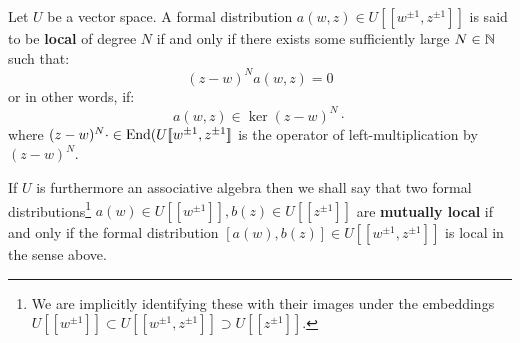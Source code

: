         \begin{definition}[Locality] \label{def: locality}
            Let $U$ be a vector space. A formal distribution $a(w, z) \in U[\![w^{\pm 1}, z^{\pm 1}]\!]$ is said to be \textbf{local} of degree $N$ if and only if there exists some sufficiently large $N \in \mathbb{N}$ such that:
                $$(z - w)^N a(w, z) = 0$$
            or in other words, if:
                $$a(w, z) \in \ker (z - w)^N \cdot$$
            where $(z - w)^N \cdot \in \mathrm{End}( U[\![w^{\pm 1}, z^{\pm 1}]\!]$ is the operator of left-multiplication by $(z - w)^N$.
                
            If $U$ is furthermore an associative algebra then we shall say that two formal distributions\footnote{We are implicitly identifying these with their images under the embeddings $U[\![w^{\pm 1}]\!] \subset U[\![w^{\pm 1}, z^{\pm 1}]\!] \supset U[\![z^{\pm 1}]\!]$.} $a(w) \in U[\![w^{\pm 1}]\!], b(z) \in U[\![z^{\pm 1}]\!]$ are \textbf{mutually local} if and only if the formal distribution $[a(w), b(z)] \in U[\![w^{\pm 1}, z^{\pm 1}]\!]$ is local in the sense above.
        \end{definition}
        
